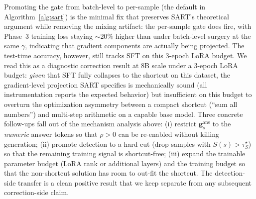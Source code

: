 Promoting the gate from batch-level to per-sample (the default in Algorithm~\ref{alg:sart}) is the minimal fix that preserves SART's theoretical argument while removing the mixing artifact: the per-sample gate does fire, with Phase~3 training loss staying $\sim\!20\%$ higher than under batch-level surgery at the same $\gamma$, indicating that gradient components are actually being projected. The test-time accuracy, however, still tracks SFT on this 3-epoch LoRA budget. We read this as a diagnostic correction result at 8B scale under a 3-epoch LoRA budget: \emph{given} that SFT fully collapses to the shortcut on this dataset, the gradient-level projection SART specifies is mechanically sound (all instrumentation reports the expected behavior) but insufficient on this budget to overturn the optimization asymmetry between a compact shortcut (``sum all numbers'') and multi-step arithmetic on a capable base model. Three concrete follow-ups fall out of the mechanism analysis above: (i) restrict $\mathbf{g}_s^{\mathrm{ans}}$ to the \emph{numeric} answer tokens so that $\rho > 0$ can be re-enabled without killing generation; (ii) promote detection to a hard cut (drop samples with $S(s) > \tau_S^\star$) so that the remaining training signal is shortcut-free; (iii) expand the trainable parameter budget (LoRA rank or additional layers) and the training budget so that the non-shortcut solution has room to out-fit the shortcut. The detection-side transfer is a clean positive result that we keep separate from any subsequent correction-side claim.
